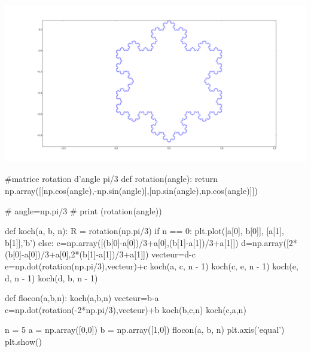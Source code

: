 \documentclass[10pt,fleqn]{book} %
\begin{document}
\begin{multicols}{2}
\begin{center}
\includegraphics[width=.95\linewidth]{images/flocon_von_koch}
\end{center}

\ifprof
\begin{corrige}
\begin{python}
#matrice rotation d'angle pi/3
def rotation(angle):
    return np.array([[np.cos(angle),-np.sin(angle)],[np.sin(angle),np.cos(angle)]])

# angle=np.pi/3    
# print (rotation(angle))

def koch(a, b, n):
    R = rotation(np.pi/3)
    if n == 0:
        plt.plot([a[0], b[0]], [a[1], b[1]],'b')
    else:
        c=np.array([(b[0]-a[0])/3+a[0],(b[1]-a[1])/3+a[1]])
        d=np.array([2*(b[0]-a[0])/3+a[0],2*(b[1]-a[1])/3+a[1]])
        vecteur=d-c
        e=np.dot(rotation(np.pi/3),vecteur)+c
        koch(a, c, n - 1)
        koch(c, e, n - 1)
        koch(e, d, n - 1)
        koch(d, b, n - 1)
        
def flocon(a,b,n):
    koch(a,b,n)
    vecteur=b-a
    c=np.dot(rotation(-2*np.pi/3),vecteur)+b
    koch(b,c,n)
    koch(c,a,n)

n = 5
a = np.array([0,0])
b = np.array([1,0])
flocon(a, b, n)
plt.axis('equal')
plt.show()
\end{python}
\end{corrige}
\else
\fi

\ifprof
\else
\end{multicols}
\fi


\end{document}

